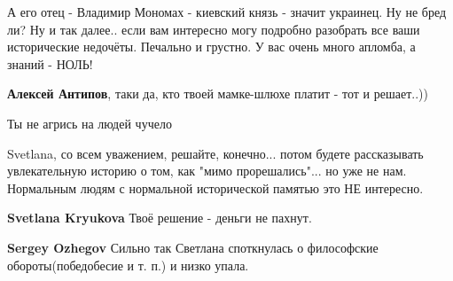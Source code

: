 \begin{itemize}
\begin{itemize}
А его отец - Владимир Мономах - киевский князь - значит украинец. Ну не бред
ли? Ну и так далее.. если вам интересно могу подробно разобрать все ваши
исторические недочёты. Печально и грустно. У вас очень много апломба, а знаний
- НОЛЬ!

 
\textbf{Алексей Антипов}, таки да, кто твоей мамке-шлюхе платит - тот и решает..))

 
Ты не агрись на людей чучело

 
Svetlana, со всем уважением, решайте, конечно... потом будете рассказывать увлекательную историю о том, как "мимо прорешались"... но уже не нам. Нормальным людям с нормальной исторической памятью это НЕ интересно.

 
\textbf{Svetlana Kryukova} Твоё решение - деньги не пахнут.

 
\textbf{Sergey Ozhegov}
Сильно так Светлана споткнулась о философские обороты(победобесие и т. п.) и низко упала.

 

\end{itemize}
\end{itemize}
